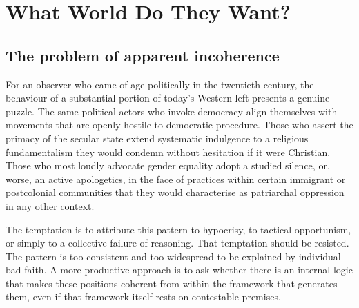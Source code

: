 \chapter{What World Do They Want?}

\begingroup

\begin{abstract}
		\noindent
		Contemporary left-wing political movements in Europe and the United States exhibit
		a pattern of contradictions that resist explanation through the conceptual vocabulary
		of twentieth-century socialism: stated commitments to democracy, secularism, and
		gender equality coexist with observable alliances with forces antithetical to each of
		those commitments. This article attempts a structural account of that pattern. Three
		complementary explanatory frameworks are proposed, identitarian coalitionism, the
		post-Marxist substitution of the revolutionary subject, and the psychosocial function
		of collective guilt, and integrated into a synthetic description of the positive
		project, such as it is, that underlies contemporary left-wing activism. The analysis
		concludes that the observable incoherence is not accidental but follows from a
		coherent internal logic, and that the most serious risk it generates is not for its
		declared adversaries but for the movement itself.
	\end{abstract}
	
	\section{The problem of apparent incoherence}
	
	For an observer who came of age politically in the twentieth century, the behaviour
	of a substantial portion of today's Western left presents a genuine puzzle. The
	same political actors who invoke democracy align themselves with movements that
	are openly hostile to democratic procedure. Those who assert the primacy of the
	secular state extend systematic indulgence to a religious fundamentalism they would
	condemn without hesitation if it were Christian. Those who most loudly advocate
	gender equality adopt a studied silence, or, worse, an active apologetics, in the
	face of practices within certain immigrant or postcolonial communities that they
	would characterise as patriarchal oppression in any other context.
	
	The temptation is to attribute this pattern to hypocrisy, to tactical opportunism,
	or simply to a collective failure of reasoning. That temptation should be resisted.
	The pattern is too consistent and too widespread to be explained by individual
	bad faith. A more productive approach is to ask whether there is an internal logic
	that makes these positions coherent from within the framework that generates them,
	even if that framework itself rests on contestable premises.
	
